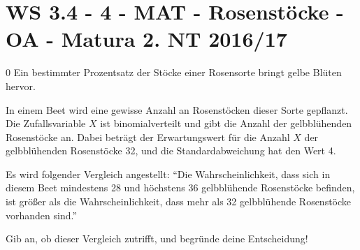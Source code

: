 \section{WS 3.4 - 4 - MAT - Rosenstöcke - OA - Matura 2. NT 2016/17}


\begin{langesbeispiel} \item[0] %
Ein bestimmter Prozentsatz der Stöcke einer Rosensorte bringt gelbe Blüten hervor.

In einem Beet wird eine gewisse Anzahl an Rosenstöcken dieser Sorte gepflanzt. Die Zufallsvariable $X$ ist binomialverteilt und gibt die Anzahl der gelbblühenden Rosenstöcke an. Dabei beträgt der Erwartungswert für die Anzahl $X$ der gelbblühenden Rosenstöcke 32, und die Standardabweichung hat den Wert 4.

Es wird folgender Vergleich angestellt:
"`Die Wahrscheinlichkeit, dass sich in diesem Beet mindestens 28 und höchstens 36 gelbblühende Rosenstöcke befinden, ist größer als die Wahrscheinlichkeit, dass mehr als 32 gelbblühende Rosenstöcke vorhanden sind."'

Gib an, ob dieser Vergleich zutrifft, und begründe deine Entscheidung!\leer

\end{langesbeispiel}
